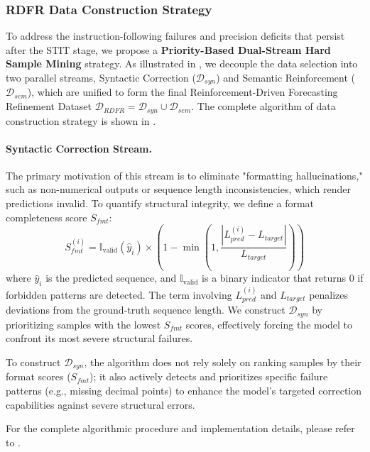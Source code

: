 \subsubsection{RDFR Data Construction Strategy}

To address the instruction-following failures and precision deficits that persist after the STIT stage, we propose a \textbf{Priority-Based Dual-Stream Hard Sample Mining} strategy. As illustrated in , we decouple the data selection into two parallel streams, Syntactic Correction ($\mathcal{D}_{syn}$) and Semantic Reinforcement ($\mathcal{D}_{sem}$), which are unified to form the final Reinforcement-Driven Forecasting Refinement Dataset $\mathcal{D}_{RDFR} = \mathcal{D}_{syn} \cup \mathcal{D}_{sem}$.
The complete algorithm of data construction strategy is shown in .


\paragraph{Syntactic Correction Stream.}
The primary motivation of this stream is to eliminate "formatting hallucinations," such as non-numerical outputs or sequence length inconsistencies, which render predictions invalid. To quantify structural integrity, we define a format completeness score $S_{fmt}$:
\begin{equation}
    S_{fmt}^{(i)} = \mathbb{I}_{\text{valid}}(\hat{y}_i) \times \left( 1 - \min\left(1, \frac{|L_{pred}^{(i)} - L_{target}|}{L_{target}}\right) \right)
\end{equation}
where $\hat{y}_i$ is the predicted sequence, and $\mathbb{I}_{\text{valid}}$ is a binary indicator that returns 0 if forbidden patterns are detected. The term involving $L_{pred}^{(i)}$ and $L_{target}$ penalizes deviations from the ground-truth sequence length. We construct $\mathcal{D}_{syn}$ by prioritizing samples with the lowest $S_{fmt}$ scores, effectively forcing the model to confront its most severe structural failures.

To construct $\mathcal{D}_{syn}$, the algorithm does not rely solely on ranking samples by their format scores ($S_{fmt}$); it also actively detects and prioritizes specific failure patterns (e.g., missing decimal points) to enhance the model's targeted correction capabilities against severe structural errors.

For the complete algorithmic procedure and implementation details, please refer to .


